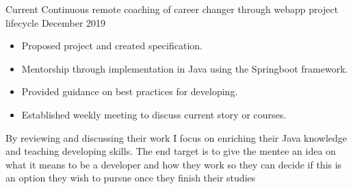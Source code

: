 %
%
%

  \begin{experiences}
    \mentoring
      {Current}
      {Continuous remote coaching of career changer through webapp project lifecycle}
      {December 2019}
      {
        \begin{itemize}
          \item Proposed project and created specification.
          \item Mentorship through implementation in Java using the Springboot framework.
          \item Provided guidance on best practices for developing.
          \item Established weekly meeting to discuss current story or courses.
        \end{itemize}
        {By reviewing and discussing their work I focus on enriching their Java knowledge and teaching developing skills.
        The end target is to give the mentee an idea on what it means to be a developer and how they work
        so they can decide if this is an option they wish to pursue once they finish their studies}
      }
  \end{experiences}